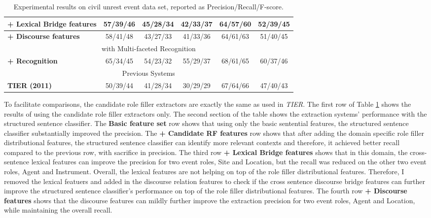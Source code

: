 \begin{table}[t]
\begin{tabular}[center]{|l|cccc|c|}
{\bf + Lexical Bridge features}  & 57/39/46 & 45/28/34 & 42/33/37 & 64/57/60 & 52/39/45\\ \hline
{\bf + Discourse features} & 58/41/48 & 43/27/33 & 41/33/36 & 64/61/63 & 51/40/45\\ \hline
\multicolumn{6}{|c|}{with Multi-faceted Recognition} \\ \hline
{\bf + Recognition} & 65/34/45 & 54/23/32 & 55/29/37 & 68/61/65 & 60/37/46\\ \hline
\multicolumn{6}{|c|}{Previous Systems} \\ \hline
{\bf TIER (2011)} & 50/39/44 & 41/28/34 & 30/29/29 & 67/64/66 & 47/40/43 \\ \hline
\end{tabular}
\caption{Experimental results on civil unrest event data set, reported as
  Precision/Recall/F-score.}
\label{results-table-linker-cu}
\end{table} 


To facilitate comparisons, the candidate role filler extractors are exactly the same as 
used in {\it TIER}. 
The first row of Table \ref{results-table-linker-cu} shows the results of using the 
candidate role filler extractors only.
The second section of the table shows the extraction systems' performance with
the structured sentence classifier. 
The {\bf Basic feature set} row shows that using only the basic sentential features, the structured 
sentence classifier substantially improved the precision. 
The {\bf + Candidate RF features} row shows that after adding the domain specific role filler distributional features, 
the structured sentence classifier can identify more relevant contexts and therefore, 
it achieved better recall compared to the previous row, with sacrifice in precision. 
The third row {\bf + Lexical Bridge features} shows that in this domain, 
the cross-sentence lexical features can improve the precision for two event roles, Site 
and Location, but the recall was reduced on the other two event roles, Agent and Instrument. 
Overall, the lexical features are not helping on top of the role filler distributional features. 
Therefore, I removed the lexical featuers and added in the discourse relation features to 
check if the cross sentence discourse bridge features can further 
improve the structured sentence classifier's performance on top of the role filler distributional features.
The fourth row {\bf + Discourse features} shows that the discourse features can mildly further improve 
the extraction precision for two event roles, Agent and Location, while maintaining the overall recall. 

